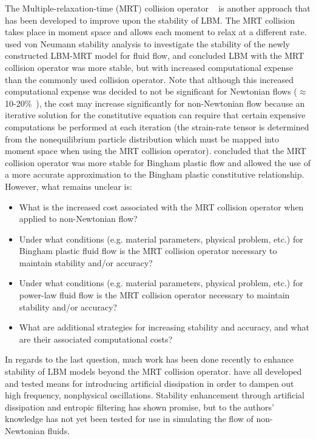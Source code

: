 The Multiple-relaxation-time (MRT) collision operator ~\cite{d1994generalized} is another approach that has been developed to improve upon the stability of LBM.
The MRT collision takes place in moment space and allows each moment to relax at a different rate.
\cite{lallemand2000theory} used von Neumann stability analysis to investigate the stability of the newly constructed LBM-MRT model for fluid flow, and concluded LBM with the MRT collision operator was more stable, but with increased computational expense than the commonly used collision operator.
Note that although this increased computational expense was decided to not be significant for Newtonian flows ($\approx$ 10-20\%~\cite{lallemand2000theory}), the cost may increase significantly for non-Newtonian flow because an iterative solution for the constitutive equation can require that certain expensive computations be performed at each iteration (the strain-rate tensor is determined from the nonequilibrium particle distribution which must be mapped into moment space when using the MRT collision operator).
\cite{chen2014simulations} concluded that the MRT collision operator was more stable for Bingham plastic flow and allowed the use of a more accurate approximation to the Bingham plastic constitutive relationship.
However, what remains unclear is:
\begin{itemize}
    \item What is the increased cost associated with the MRT collision operator when applied to non-Newtonian flow?
    \item Under what conditions (e.g. material parameters, physical problem, etc.) for Bingham plastic fluid flow is the MRT collision operator necessary to maintain stability and/or accuracy?
    \item Under what conditions (e.g. material parameters, physical problem, etc.) for power-law fluid flow is the MRT collision operator necessary to maintain stability and/or accuracy?
    \item What are additional strategies for increasing stability and accuracy, and what are their associated computational costs?
\end{itemize}
In regards to the last question, much work has been done recently to enhance stability of LBM models beyond the MRT collision operator.
\cite{brownlee2006stabilization,brownlee2007stability,brownlee2008nonequilibrium,packwood2009entropy,gorban2014enhancement} have all developed and tested means for introducing artificial dissipation in order to dampen out high frequency, nonphysical oscillations.
Stability enhancement through artificial dissipation and entropic filtering has shown promise, but to the authors' knowledge has not yet been tested for use in simulating the flow of non-Newtonian fluids.

